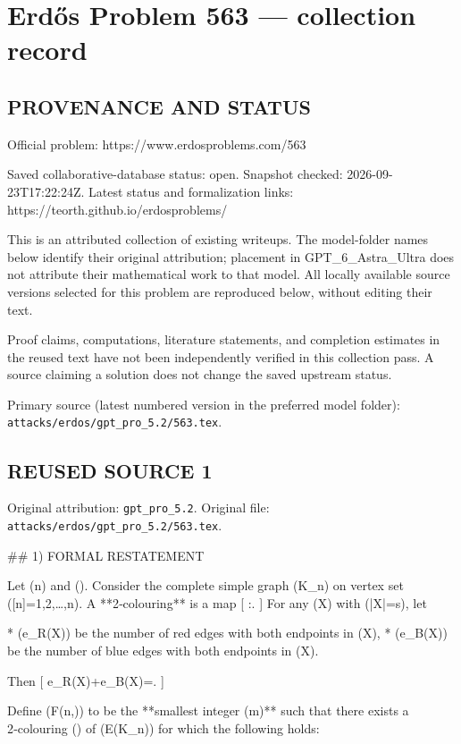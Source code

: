 \section*{Erd\H{o}s Problem 563 --- collection record}

\subsection*{PROVENANCE AND STATUS}
Official problem: https://www.erdosproblems.com/563

Saved collaborative-database status: open.
Snapshot checked: 2026-09-23T17:22:24Z.
Latest status and formalization links: https://teorth.github.io/erdosproblems/

This is an attributed collection of existing writeups. The model-folder names below identify their original attribution; placement in GPT\_6\_Astra\_Ultra does not attribute their mathematical work to that model. All locally available source versions selected for this problem are reproduced below, without editing their text.

Proof claims, computations, literature statements, and completion estimates in the reused text have not been independently verified in this collection pass. A source claiming a solution does not change the saved upstream status.

Primary source (latest numbered version in the preferred model folder): \texttt{attacks/erdos/gpt\_pro\_5.2/563.tex}.

\subsection*{REUSED SOURCE 1}
Original attribution: \texttt{gpt\_pro\_5.2}.
Original file: \texttt{attacks/erdos/gpt\_pro\_5.2/563.tex}.

## 1) FORMAL RESTATEMENT

Let (n\in{}) and (\alpha\in[0,1/2]). Consider the complete simple graph (K_n) on vertex set ([n]={1,2,\dots,n}). A **2‑colouring** is a map
[
\chi:.
]
For any (X\subseteq[n]) with (|X|=s), let

* (e_R(X)) be the number of red edges with both endpoints in (X),
* (e_B(X)) be the number of blue edges with both endpoints in (X).

Then
[
e_R(X)+e_B(X)=.
]

Define (F(n,\alpha)) to be the **smallest integer (m)** such that there exists a 2‑colouring (\chi) of (E(K_n)) for which the following holds:

